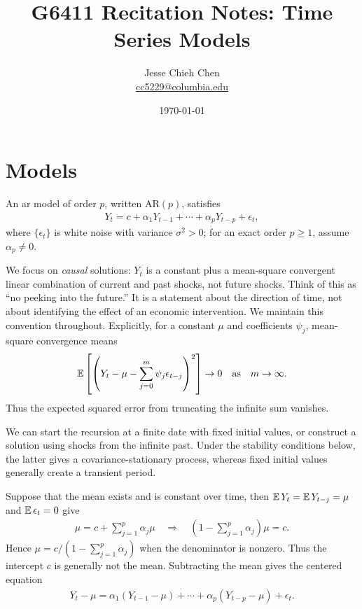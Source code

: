\documentclass[a4paper,12pt]{article}
\title{G6411 Recitation Notes: Time Series Models}
\author{Jesse Chieh Chen\\\href{mailto:cc5229@columbia.edu}{cc5229@columbia.edu}}
\date{\today}
\begin{document}
\maketitle

\section{ Models}\label{sec-ar}

\begin{definition}
	An \gls{ar} model of order $p$, written $\mathrm{AR}(p)$, satisfies
	\begin{align}\label{eq-ar}
		Y_t=c+\alpha_1Y_{t-1}+\cdots+\alpha_pY_{t-p}+\epsilon_t,
	\end{align}
	where $\{\epsilon_t\}$ is white noise with variance $\sigma^2>0$; for an exact order $p\ge1$, assume $\alpha_p\neq0$.
\end{definition}

\begin{remark}
	We focus on \emph{causal} solutions: $Y_t$ is a constant plus a mean-square convergent
	linear combination of current and past shocks, not future shocks.
	Think of this as ``no peeking into the future.''
	It is a statement about the direction of time, not about identifying the effect of an economic intervention.
	We maintain this convention throughout.
	Explicitly, for a constant $\mu$ and coefficients $\psi_j$, mean-square convergence means
	\begin{align*}
		\operatorname{\mathbb{E}}\left[\left(Y_t-\mu-\sum_{j=0}^{m}\psi_j\epsilon_{t-j}\right)^2\right]\to0
		\quad\text{as}\quad
		m\to\infty.
	\end{align*}
	Thus the expected squared error from truncating the infinite sum vanishes.
\end{remark}

\begin{remark}[Initialization]
	We can start the recursion at a finite date with fixed initial values,
	or construct a solution using shocks from the infinite past.
	Under the stability conditions below, the latter gives a covariance-stationary process,
	whereas fixed initial values generally create a transient period.
\end{remark}

\begin{remark}
	Suppose that the mean exists and is constant over time,
	then $\operatorname{\mathbb{E}} Y_t=\operatorname{\mathbb{E}} Y_{t-j}=\mu$ and $\operatorname{\mathbb{E}}\epsilon_t=0$ give
	\begin{align}
		\mu=c+\sum_{j=1}^p\alpha_j\mu
		\quad\Longrightarrow\quad
		\left(1-\sum_{j=1}^p\alpha_j\right)\mu=c.
	\end{align}
	Hence $\mu=c/(1-\sum_{j=1}^p\alpha_j)$ when the denominator is nonzero.
	Thus the intercept $c$ is generally not the mean.
	Subtracting the mean gives the centered equation
	\begin{align}
		Y_t-\mu=\alpha_1(Y_{t-1}-\mu)+\cdots+\alpha_p(Y_{t-p}-\mu)+\epsilon_t.
	\end{align}
\end{remark}
\end{document}
